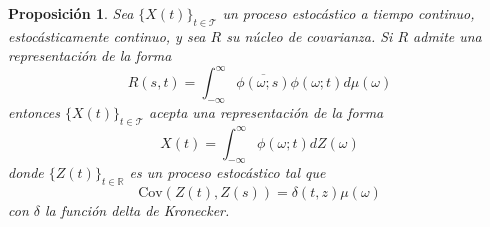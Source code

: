 \documentclass[12pt,letterpaper]{book}
\newtheorem{proposicion}[teorema]{Proposición}
\newcommand{\R}{\mathbb{R}}
\newcommand{\intR}{\int_{-\infty}^{\infty}}
\newcommand{\Cov}[1]{\mathrm{Cov}\left( #1 \right)}
\newcommand{\xt}{$\{X(t)\}_{t\in \mathcal{T}}$ }
\begin{document}
\begin{proposicion}
\label{rep_espectral}
Sea \xt un proceso estocástico a tiempo continuo, estocásticamente continuo, y sea $R$ su núcleo de covarianza.
%
Si $R$ admite una representación de la forma
\begin{equation}
R(s,t) = \intR \overline{\phi(\omega;s)}\phi(\omega;t) d\mu(\omega)
\end{equation}
entonces \xt acepta una representación de la forma
\begin{equation}
X(t) = \intR \phi(\omega; t) dZ(\omega)
\end{equation}
donde $\{ Z(t) \}_{t\in \R}$ es un proceso estocástico tal que
\begin{equation}
\Cov{Z(t),Z(s)} = \delta(t,z) \mu(\omega)
\end{equation}
con $\delta$ la función delta de Kronecker.
\end{proposicion}
\end{document}
